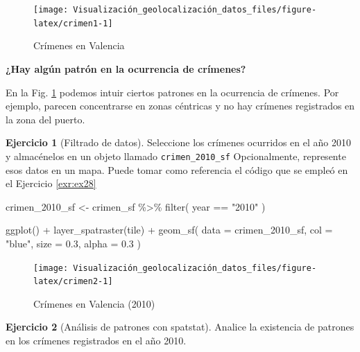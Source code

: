 \documentclass[
]{book}
\newenvironment{Shaded}{\begin{snugshade}}{\end{snugshade}}
\newcommand{\AttributeTok}[1]{\textcolor[rgb]{0.77,0.63,0.00}{#1}}
\newcommand{\FloatTok}[1]{\textcolor[rgb]{0.00,0.00,0.81}{#1}}
\newcommand{\FunctionTok}[1]{\textcolor[rgb]{0.00,0.00,0.00}{#1}}
\newcommand{\NormalTok}[1]{#1}
\newcommand{\OtherTok}[1]{\textcolor[rgb]{0.56,0.35,0.01}{#1}}
\newcommand{\SpecialCharTok}[1]{\textcolor[rgb]{0.00,0.00,0.00}{#1}}
\newcommand{\StringTok}[1]{\textcolor[rgb]{0.31,0.60,0.02}{#1}}
\theoremstyle{definition}
\theoremstyle{definition}
\theoremstyle{definition}
\newtheorem{exercise}{Ejercicio}[chapter]
\theoremstyle{definition}
\theoremstyle{remark}
\begin{document}
\begin{figure}

{\centering \texttt{[image: Visualización\_geolocalización\_datos\_files/figure-latex/crimen1-1]} 

}

\caption{Crímenes en Valencia}\label{fig:crimen1}
\end{figure}

\textbf{¿Hay algún patrón en la ocurrencia de crímenes?}

En la Fig. \ref{fig:crimen1} podemos intuir ciertos patrones en la ocurrencia
de crímenes. Por ejemplo, parecen concentrarse en zonas céntricas y no hay
crímenes registrados en la zona del puerto.

\begin{exercise}[Filtrado de datos]
\protect\hypertarget{exr:ex29}{}\label{exr:ex29}Seleccione los crímenes ocurridos en el año 2010 y almacénelos en un objeto
llamado \texttt{crimen\_2010\_sf} Opcionalmente, represente esos datos en un mapa. Puede
tomar como referencia el código que se empleó en el Ejercicio \ref{exr:ex28}
\end{exercise}

\begin{Shaded}
\begin{Highlighting}[]
\NormalTok{crimen\_2010\_sf }\OtherTok{\textless{}{-}}\NormalTok{ crimen\_sf }\SpecialCharTok{\%\textgreater{}\%}
  \FunctionTok{filter}\NormalTok{(}
\NormalTok{    year }\SpecialCharTok{==} \StringTok{"2010"}
\NormalTok{  )}

\FunctionTok{ggplot}\NormalTok{() }\SpecialCharTok{+}
  \FunctionTok{layer\_spatraster}\NormalTok{(tile) }\SpecialCharTok{+}
  \FunctionTok{geom\_sf}\NormalTok{(}
    \AttributeTok{data =}\NormalTok{ crimen\_2010\_sf,}
    \AttributeTok{col =} \StringTok{"blue"}\NormalTok{,}
    \AttributeTok{size =} \FloatTok{0.3}\NormalTok{,}
    \AttributeTok{alpha =} \FloatTok{0.3}
\NormalTok{  )}
\end{Highlighting}
\end{Shaded}

\begin{figure}

{\centering \texttt{[image: Visualización\_geolocalización\_datos\_files/figure-latex/crimen2-1]} 

}

\caption{Crímenes en Valencia (2010)}\label{fig:crimen2}
\end{figure}

\begin{exercise}[Análisis de patrones con spatstat]
\protect\hypertarget{exr:ex30}{}\label{exr:ex30}Analice la existencia de patrones en los crímenes registrados en el año 2010.
\end{exercise}
\end{document}
